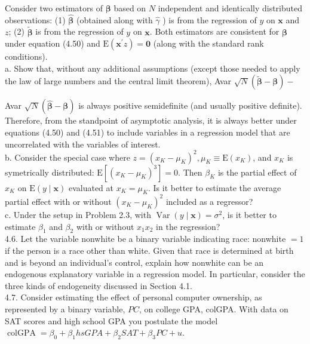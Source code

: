 \documentclass[10pt]{article}
\begin{document}
Consider two estimators of $\boldsymbol{\beta}$ based on $N$ independent and identically distributed observations: (1) $\hat{\boldsymbol{\beta}}$ (obtained along with $\hat{\gamma}$ ) is from the regression of $y$ on $\mathbf{x}$ and $z$; (2) $\tilde{\boldsymbol{\beta}}$ is from the regression of $y$ on $\mathbf{x}$. Both estimators are consistent for $\boldsymbol{\beta}$ under equation (4.50) and $\mathrm{E}\left(\mathbf{x}^{\prime} z\right)=\mathbf{0}$ (along with the standard rank conditions).\\
a. Show that, without any additional assumptions (except those needed to apply the law of large numbers and the central limit theorem), Avar $\sqrt{N}(\tilde{\boldsymbol{\beta}}-\boldsymbol{\beta})-$

Avar $\sqrt{N}(\hat{\boldsymbol{\beta}}-\boldsymbol{\beta})$ is always positive semidefinite (and usually positive definite). Therefore, from the standpoint of asymptotic analysis, it is always better under equations (4.50) and (4.51) to include variables in a regression model that are uncorrelated with the variables of interest.\\
b. Consider the special case where $z=\left(x_{K}-\mu_{K}\right)^{2}, \mu_{K} \equiv \mathrm{E}\left(x_{K}\right)$, and $x_{K}$ is symetrically distributed: $\mathrm{E}\left[\left(x_{K}-\mu_{K}\right)^{3}\right]=0$. Then $\beta_{K}$ is the partial effect of $x_{K}$ on $\mathrm{E}(y \mid \mathbf{x})$ evaluated at $x_{K}=\mu_{K}$. Is it better to estimate the average partial effect with or without $\left(x_{K}-\mu_{K}\right)^{2}$ included as a regressor?\\
c. Under the setup in Problem 2.3, with $\operatorname{Var}(y \mid \mathbf{x})=\sigma^{2}$, is it better to estimate $\beta_{1}$ and $\beta_{2}$ with or without $x_{1} x_{2}$ in the regression?\\
4.6. Let the variable nonwhite be a binary variable indicating race: nonwhite $=1$ if the person is a race other than white. Given that race is determined at birth and is beyond an individual's control, explain how nonwhite can be an endogenous explanatory variable in a regression model. In particular, consider the three kinds of endogeneity discussed in Section 4.1.\\
4.7. Consider estimating the effect of personal computer ownership, as represented by a binary variable, $P C$, on college GPA, colGPA. With data on SAT scores and high school GPA you postulate the model\\
$\operatorname{colGPA}=\beta_{0}+\beta_{1} h s G P A+\beta_{2} S A T+\beta_{3} P C+u$.\\
\end{document}
